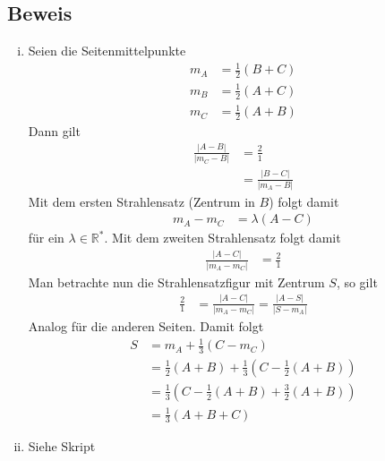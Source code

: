 \documentclass[11pt]{article}
\begin{document}
\subsection*{Beweis}
\begin{enumerate}[i)]
	\item Seien die Seitenmittelpunkte
	\begin{equation*}
	\begin{aligned}
	m_A &= \frac{1}{2} \left(B + C\right)\\
	m_B &= \frac{1}{2} \left(A + C\right)\\
	m_C &= \frac{1}{2} \left(A + B\right)
	\end{aligned}
	\end{equation*}
	Dann gilt
	\begin{equation*}
	\begin{aligned}
	\frac{\left|A - B\right|}{\left|m_C - B\right|} &= \frac{2}{1}\\
	&= \frac{\left|B - C\right|}{\left|m_A - B\right|}
	\end{aligned}
	\end{equation*}
	Mit dem ersten Strahlensatz (Zentrum in $ B $) folgt damit
	\begin{equation*}
	\begin{aligned}
	m_A - m_C &= \lambda\left(A - C\right)
	\end{aligned}
	\end{equation*}
	für ein $ \lambda \in \mathbb{R}^* $. Mit dem zweiten Strahlensatz folgt damit
	\begin{equation*}
	\begin{aligned}
	\frac{\left|A-C\right|}{\left|m_A - m_C\right|} &= \frac{2}{1}
	\end{aligned}
	\end{equation*}
	Man betrachte nun die Strahlensatzfigur mit Zentrum $ S $, so gilt
	\begin{equation*}
	\begin{aligned}
	\frac{2}{1} &= \frac{\left|A-C\right|}{\left|m_A - m_C\right|} = \frac{\left|A - S\right|}{\left|S - m_A\right|}
	\end{aligned}
	\end{equation*}
	Analog für die anderen Seiten. Damit folgt
	\begin{equation*}
	\begin{aligned}
	S &= m_A + \frac{1}{3} \left(C-m_C\right)\\
	&= \frac{1}{2} \left(A+B\right) + \frac{1}{3} \left(C - \frac{1}{2}\left(A + B\right)\right)\\
	&= \frac{1}{3} \left(C - \frac{1}{2}\left(A+B\right) + \frac{3}{2}\left(A+B\right)\right)\\
	&= \frac{1}{3} \left(A + B + C\right)
	\end{aligned}
	\end{equation*}
	\item Siehe Skript
\end{enumerate}
\end{document}

